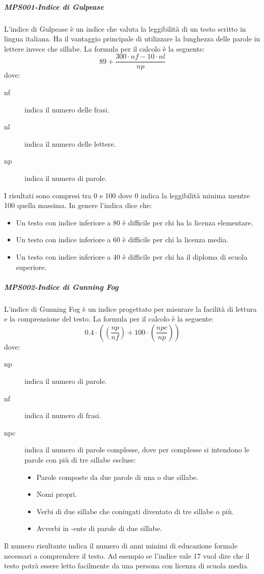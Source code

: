 \documentclass[../norme-di-progetto.tex]{subfiles}
\begin{document}
\subparagraph{MPS001-Indice di Gulpease}%
\label{subp:MPS001-indice_di_Gulpease}

L'indice di Gulpease è un indice che valuta la leggibilità di un testo scritto in lingua italiana. Ha il vantaggio principale di utilizzare la lunghezza delle parole in lettere invece che sillabe. La formula per il calcolo è la seguente:
\[
    89 +\frac{300\cdot nf-10\cdot nl}{np}
\]
dove:
\begin{description}
  \item [nf] indica il numero delle frasi.
  \item [nl] indica il numero delle lettere.
  \item [np] indica il numero di parole.
\end{description}
I risultati sono compresi tra 0 e 100 dove 0 indica la leggibilità minima mentre 100 quella massima. In genere l'indica dice che:
\begin{itemize}
  \item Un testo con indice inferiore a 80 è difficile per chi ha la licenza elementare.
  \item Un testo con indice inferiore a 60 è difficile per chi la licenza media.
  \item Un testo con indice inferiore a 40 è difficile per chi ha il diploma di scuola superiore.
\end{itemize}
\subparagraph{MPS002-Indice di Gunning Fog}%
\label{subp:MPS002-indice_di_Gunning_Fog}

L'indice di Gunning Fog è un indice progettato per misurare la facilità di lettura e la comprensione del testo. La formula per il calcolo è la seguente:
\[
    0.4\cdot((\frac{np}{nf})+100\cdot(\frac{npc}{np}))
\]
dove:
\begin{description}
  \item [np] indica il numero di parole.
  \item [nf] indica il numero di frasi.
  \item [npc] indica il numero di parole complesse, dove per complesse si intendono le parole con più di tre sillabe escluse:
  \begin{itemize}
    \item Parole composte da due parole di una o due sillabe.
    \item Nomi propri.
    \item Verbi di due sillabe che coniugati diventato di tre sillabe o più.
    \item Avverbi in -ente di parole di due sillabe.
  \end{itemize}
 \end{description}
  Il numero risultante indica il numero di anni minimi di educazione formale necessari a comprendere il testo. Ad esempio se l'indice vale 17 vuol dire che il testo potrà essere letto facilmente da una persona con licenza di scuola media.
\end{document}
